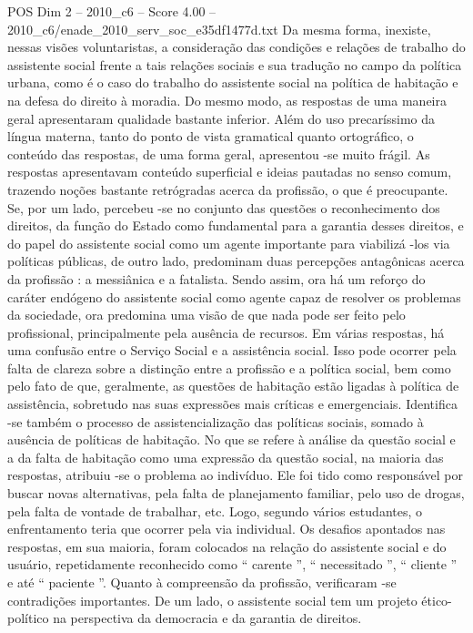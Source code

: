 \begin{textsample}{POS Dim 2 – 2010\_c6 – Score 4.00 – 2010\_c6/enade\_2010\_serv\_soc\_e35df1477d.txt}
Da mesma forma, inexiste, nessas visões voluntaristas, a consideração das condições e relações de trabalho do assistente social frente a tais relações sociais e sua tradução no campo da política urbana, como é o caso do trabalho do assistente social na política de habitação e na defesa do direito à moradia.
Do mesmo modo, as respostas de uma maneira geral apresentaram qualidade bastante inferior.
Além do uso precaríssimo da língua materna, tanto do ponto de vista gramatical quanto ortográfico, o conteúdo das respostas, de uma forma geral, apresentou -se muito frágil.
As respostas apresentavam conteúdo superficial e ideias pautadas no senso comum, trazendo noções bastante retrógradas acerca da profissão, o que é preocupante.
Se, por um lado, percebeu -se no conjunto das questões o reconhecimento dos direitos, da função do Estado como fundamental para a garantia desses direitos, e do papel do assistente social como um agente importante para viabilizá -los via políticas públicas, de outro lado, predominam duas percepções antagônicas acerca da profissão : a messiânica e a fatalista.
Sendo assim, ora há um reforço do caráter endógeno do assistente social como agente capaz de resolver os problemas da sociedade, ora predomina uma visão de que nada pode ser feito pelo profissional, principalmente pela ausência de recursos.
Em várias respostas, há uma confusão entre o Serviço Social e a assistência social.
Isso pode ocorrer pela falta de clareza sobre a distinção entre a profissão e a política social, bem como pelo fato de que, geralmente, as questões de habitação estão ligadas à política de assistência, sobretudo nas suas expressões mais críticas e emergenciais.
Identifica -se também o processo de assistencialização das políticas sociais, somado à ausência de políticas de habitação.
No que se refere à análise da questão social e a da falta de habitação como uma expressão da questão social, na maioria das respostas, atribuiu -se o problema ao indivíduo.
Ele foi tido como responsável por buscar novas alternativas, pela falta de planejamento familiar, pelo uso de drogas, pela falta de vontade de trabalhar, etc.
Logo, segundo vários estudantes, o enfrentamento teria que ocorrer pela via individual.
Os desafios apontados nas respostas, em sua maioria, foram colocados na relação do assistente social e do usuário, repetidamente reconhecido como “ carente ”, “ necessitado ”, “ cliente ” e até “ paciente ”.
Quanto à compreensão da profissão, verificaram -se contradições importantes.
De um lado, o assistente social tem um projeto ético-político na perspectiva da democracia e da garantia de direitos.

\end{textsample}

